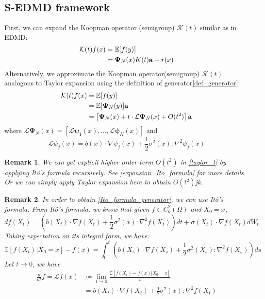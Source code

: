 \documentclass{article}[11]
\newtheorem*{remark}{Remark}
\begin{document}
\subsection*{S-EDMD framework}
First, we can expand the Koopman operator (semigroup) $\mathcal{K}(t)$ similar as in EDMD:
\begin{align}\label{edmd_expansion}
	\mathcal{K}(t) f(x) 
	&= \mathbb{E}[f(y)] \notag\\
	&= \mathbf{\Psi}_N(x)K(t)\mathbf{a} + r(x) 
\end{align}
Alternatively, we approximate the Koopman operator(semigroup) $\mathcal{K}(t)$ analogous to Taylor expansion using the definition of generator\eqref{def_generator}:
\begin{align}\label{taylor_t}
	\mathcal{K}(t)f(x) &= \mathbb{E}[f(y)] \notag\\
	&= \mathbb{E}[\mathbf{\Psi}_N(y)]\mathbf{a} \notag\\
	&= \left[ \mathbf{\Psi}_N(x) + t \cdot \mathcal{L}\mathbf{\Psi}_N(x) + O(t^2)  \right]\mathbf{a}
\end{align}
where $\mathcal{L}\mathbf{\Psi}_N(x) = \left[ \mathcal{L}\mathbf{\psi}_1(x), \dots, \mathcal{L}\mathbf{\psi}_N(x) \right]$ and
\begin{equation}\label{Ito_formula_generator}
	\mathcal{L}\psi_j(x) = b(x)\cdot \nabla\psi_j(x) + \frac{1}{2}\sigma^2(x)\colon \nabla^2 \psi_j(x)
\end{equation}
\begin{remark}
	We can get explicit higher order term $O(t^2)$ in \eqref{taylor_t} by applying It\^{o}'s formula recursively. See \ref{expansion_Ito_formula} for more details. Or we can simply apply Taylor expansion here to obtain $O(t^2)$jk.
\end{remark}
\begin{remark}
	In order to obtain \eqref{Ito_formula_generator}, we can use It\^{o}'s formula. From It\^{o}'s formula, we know that given $f\in C_b^2(\Omega)$ and $X_0=x$,
	$$ df(X_t) = \left(b(X_t)\cdot \nabla f(X_t) + \frac{1}{2}\sigma^2(x)\colon \nabla^2 f(X_t)\right)dt + \sigma(X_t)\cdot \nabla f(X_t)dW_t $$
	Taking expectation on its integral form, we have: 
	$$\mathbb{E}[f(X_t)|X_0=x]-f(x) = \int_0^t \left( b(X_s)\cdot \nabla f(X_s) + \frac{1}{2}\sigma^2(X_s)\colon \nabla^2 f(X_s) \right) ds$$
	Let $t \to 0$, we have
	\begin{align*}
		\frac{d}{dt}f = \mathcal{L}f(x) &\coloneqq \lim_{t \to 0} \frac{\mathbb{E}[f(X_t)-f(x)|X_0=x]}{t} \\
		&= b(X_t)\cdot \nabla f(X_t) + \frac{1}{2}\sigma^2(x)\colon \nabla^2 f(X_t)
	\end{align*}
\end{remark}
\end{document}

